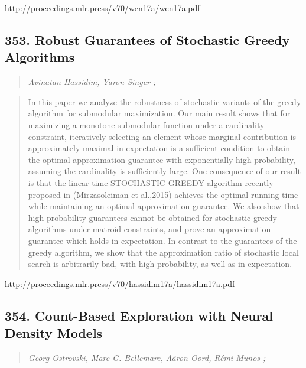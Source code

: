 \documentclass{article}
\begin{document}
\href{http://proceedings.mlr.press/v70/wen17a/wen17a.pdf}{http://proceedings.mlr.press/v70/wen17a/wen17a.pdf}

\subsection{353. Robust Guarantees of Stochastic Greedy Algorithms}

\begin{quote}
\footnotesize{\textit{Avinatan Hassidim, Yaron Singer ;}}

\end{quote}

\begin{quote}
    In this paper we analyze the robustness of stochastic variants of the greedy algorithm for submodular maximization. Our main result shows that for maximizing a monotone submodular function under a cardinality constraint, iteratively selecting an element whose marginal contribution is approximately maximal in expectation is a sufficient condition to obtain the optimal approximation guarantee with exponentially high probability, assuming the cardinality is sufficiently large. One consequence of our result is that the linear-time STOCHASTIC-GREEDY algorithm recently proposed in (Mirzasoleiman et al.,2015) achieves the optimal running time while maintaining an optimal approximation guarantee. We also show that high probability guarantees cannot be obtained for stochastic greedy algorithms under matroid constraints, and prove an approximation guarantee which holds in expectation. In contrast to the guarantees of the greedy algorithm, we show that the approximation ratio of stochastic local search is arbitrarily bad, with high probability, as well as in expectation.  
\end{quote}

\href{http://proceedings.mlr.press/v70/hassidim17a/hassidim17a.pdf}{http://proceedings.mlr.press/v70/hassidim17a/hassidim17a.pdf}

\subsection{354. Count-Based Exploration with Neural Density Models}

\begin{quote}
\footnotesize{\textit{Georg Ostrovski, Marc G. Bellemare, Aäron Oord, Rémi Munos ;}}

\end{quote}
\end{document}
